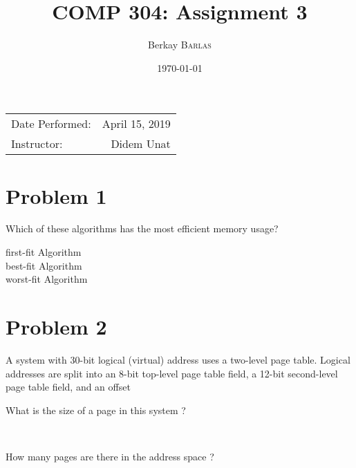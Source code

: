 \documentclass{article}
\title{COMP 304: Assignment 3} %
\author{Berkay \textsc{Barlas}} %
\date{\today} %
\begin{document}
\maketitle %

\begin{center}
\begin{tabular}{l r}
Date Performed: & April 15, 2019 \\ %
Instructor: & Didem Unat %
\end{tabular}
\end{center}




\section{Problem 1}

Which of these algorithms has the most efficient memory usage?
\begin{description}
    \item[first-fit Algorithm] \hfill 
    
    \item[best-fit Algorithm] \hfill 
    
    \item[worst-fit Algorithm] \hfill 
    
\end{description}

\section{Problem 2}
A system with 30-bit logical (virtual) address uses a two-level page table.
Logical addresses are split into an 8-bit top-level page table field, a 12-bit second-level page
table field, and an offset
\begin{description}
    \item[What is the size of a page in this system ?] \hfill \\ 
    \item[How many pages are there in the address space ?] \hfill \\ 
\end{description}
\end{document}
